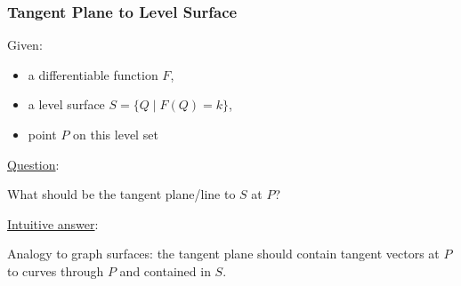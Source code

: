 \begin{frame}
  \frametitle{Tangent Plane to Level Surface}

Given:
  \begin{itemize}
    \item a differentiable function $F$,
    \item a level surface $S=\{ Q\; | \; F(Q) = k\}$,
    \item point $P$ on this level set
  \end{itemize}

\underline{Question}:

\begin{center}
  What should be the tangent plane/line to $S$ at $P$?
\end{center}


\pause
\underline{Intuitive answer}:

Analogy to graph surfaces: the tangent plane should contain tangent vectors at $P$ to curves through $P$ and contained in $S$.
\end{frame}
